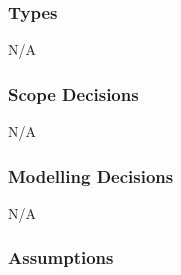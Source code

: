 \documentclass[12pt]{article}
\begin{document}
\subsubsection{Types}

N/A

\subsubsection{Scope Decisions}

N/A
\subsubsection{Modelling Decisions}

N/A

\subsubsection{Assumptions} \label{sec_assumpt}
\end{document}
